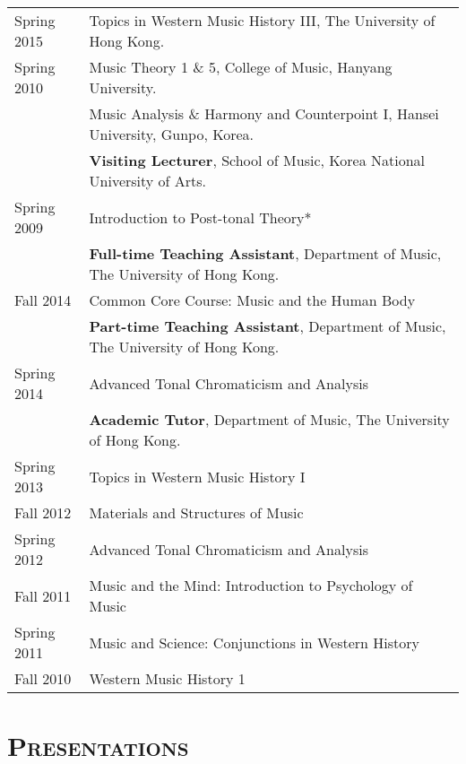 \documentclass[a4paper,11pt]{article}
\begin{document}
\begin{tabular}{p{2.5cm} l}
    Spring 2015 & Topics in Western Music History III, The University of Hong Kong.\\
    
    Spring 2010 & Music Theory 1 \& 5, College of Music, Hanyang University.\\
    & Music Analysis \& Harmony and Counterpoint I, Hansei University, Gunpo, Korea.\\[2mm]
    
	& \textbf{Visiting Lecturer}, School of Music, Korea National University of Arts.\\
	Spring 2009 & Introduction to Post-tonal Theory*\\[2mm]
	
    & \textbf{Full-time Teaching Assistant}, Department of Music, The University of Hong Kong.\\
    Fall 2014 & Common Core Course: Music and the Human Body\\[2mm]
    
    & \textbf{Part-time Teaching Assistant}, Department of Music, The University of Hong Kong.\\
    Spring 2014 & Advanced Tonal Chromaticism and Analysis\\[2mm]
    
    & \textbf{Academic Tutor}, Department of Music, The University of Hong Kong.\\
    Spring 2013 & Topics in Western Music History I\\
    Fall 2012 & Materials and Structures of Music\\
    Spring 2012 & Advanced Tonal Chromaticism and Analysis\\
    Fall 2011 & Music and the Mind: Introduction to Psychology of Music\\
    Spring 2011 & Music and Science: Conjunctions in Western History\\
    Fall 2010 & Western Music History 1
  \end{tabular}
  
  \vspace{5.0mm}
  
  \section*{\textsc{Presentations}}
  
\end{document}
